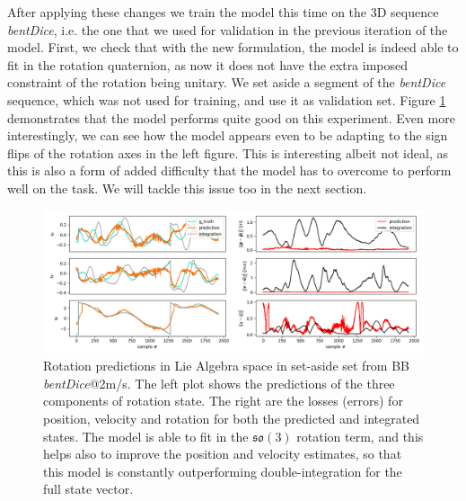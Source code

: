 After applying these changes we train the model this time on the 3D sequence \emph{bentDice}, i.e. the one that we used for validation in the previous iteration of the model.
First, we check that with the new formulation, the model is indeed able to fit in the rotation quaternion, as now it does not have the extra imposed constraint of the rotation being unitary.
We set aside a segment of the \emph{bentDice} sequence, which was not used for training, and use it as validation set.
Figure \ref{fig:so3_rotation_fit} demonstrates that the model performs quite good on this experiment.
Even more interestingly, we can see how the model appears even to be adapting to the sign flips of the rotation axes in the left figure.
This is interesting albeit not ideal, as this is also a form of added difficulty that the model has to overcome to perform well on the task. 
We will tackle this issue too in the next section.
\begin{figure}
    \centering
    \includegraphics[width=\textwidth,height=\textheight,keepaspectratio]{thesis_template/img/imu_int_so3_rot_fit.jpg}
    \caption{Rotation predictions in Lie Algebra space in set-aside set from BB \emph{bentDice}@2m/s. The left plot shows the predictions of the three components of rotation state.
    The right are the losses (errors) for position, velocity and rotation for both the predicted and integrated states.
    The model is able to fit in the $\mathfrak{so}(3)$ rotation term, and this helps also to improve the position and velocity estimates, so that this model is constantly outperforming double-integration for the full state vector. }
    \label{fig:so3_rotation_fit}
\end{figure}


